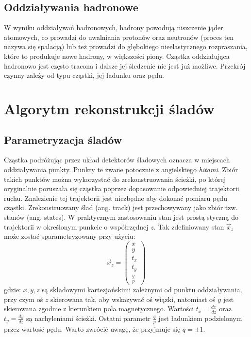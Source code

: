 \subsection{Oddziaływania hadronowe}
W wyniku oddziaływań hadronowych, hadrony powodują niszczenie jąder atomowych, co prowadzi do uwalniania protonów oraz neutronów (proces ten nazywa się spalacją) lub też prowadzi do głębokiego nieelastycznego rozpraszania, które to produkuje nowe hadrony, w większości piony. 
Cząstka oddziałująca hadronowo jest często tracona i dalsze jej śledzenie nie jest już możliwe. Przekrój czynny zależy od typu cząstki, jej ładunku oraz pędu. 

\section{Algorytm rekonstrukcji śladów}
\subsection{Parametryzacja śladów}
Cząstka podróżując przez układ detektorów śladowych oznacza w miejscach oddziaływania punkty. Punkty te zwane potocznie z angielskiego \textit{hitami}. Zbiór takich punktów można wykorzystać do zrekonstruowania ścieżki, po której oryginalnie poruszała się cząstka poprzez dopasowanie odpowiedniej trajektorii ruchu.  Znalezienie tej trajektorii jest niezbędne aby dokonać pomiaru pędu cząstki. Zrekonstruowany ślad (ang. track) jest przechowywany jako zbiór tzw. stanów (ang. states). W praktycznym zastosowaniu stan jest prostą styczną do trajektorii w określonym punkcie o współrzędnej $z$. Tak zdefiniowany stan $\vec{x}_z$ może zostać sparametryzowany przy użyciu: 
\begin{equation}
\vec{x}_z=\begin{pmatrix}
x\\ y \\ t_x \\ t_y \\ \frac{q}{p}
\end{pmatrix}
\end{equation}
gdzie: $x,y,z$ są składowymi kartezjańskimi zależnymi od punktu oddziaływania, przy czym oś $z$ skierowana tak, aby wskazywać oś wiązki,  natomiast oś $y$ jest skierowana zgodnie z kierunkiem pola magnetycznego. Wartości $t_x=\frac{dx}{dz}$ oraz $t_y=\frac{dy}{dz}$ są nachyleniami ścieżki. Ostatni parametr $\frac{q}{p}$ jest ładunkiem podzielonym przez wartość pędu. Warto zwrócić uwagę, że przyjmuje się $q= \pm 1$.

